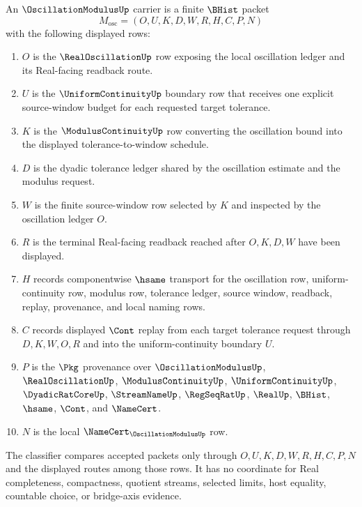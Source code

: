 \begin{definition}
\label{def:oscillation-modulus-carrier}
An $\OscillationModulusUp$ carrier is a finite $\BHist$ packet
$$
M_{\mathrm{osc}}=(O,U,K,D,W,R,H,C,P,N)
$$
with the following displayed rows:
\begin{enumerate}
\item $O$ is the $\RealOscillationUp$ row exposing the local oscillation ledger and its Real-facing readback route.
\item $U$ is the $\UniformContinuityUp$ boundary row that receives one explicit source-window budget for each requested target tolerance.
\item $K$ is the $\ModulusContinuityUp$ row converting the oscillation bound into the displayed tolerance-to-window schedule.
\item $D$ is the dyadic tolerance ledger shared by the oscillation estimate and the modulus request.
\item $W$ is the finite source-window row selected by $K$ and inspected by the oscillation ledger $O$.
\item $R$ is the terminal Real-facing readback reached after $O,K,D,W$ have been displayed.
\item $H$ records componentwise $\hsame$ transport for the oscillation row, uniform-continuity row, modulus row, tolerance ledger, source window, readback, replay, provenance, and local naming rows.
\item $C$ records displayed $\Cont$ replay from each target tolerance request through $D,K,W,O,R$ and into the uniform-continuity boundary $U$.
\item $P$ is the $\Pkg$ provenance over $\OscillationModulusUp$, $\RealOscillationUp$, $\ModulusContinuityUp$, $\UniformContinuityUp$, $\DyadicRatCoreUp$, $\StreamNameUp$, $\RegSeqRatUp$, $\RealUp$, $\BHist$, $\hsame$, $\Cont$, and $\NameCert$.
\item $N$ is the local $\NameCert_{\OscillationModulusUp}$ row.
\end{enumerate}
The classifier compares accepted packets only through $O,U,K,D,W,R,H,C,P,N$ and the displayed routes among those rows. It has no coordinate for Real completeness, compactness, quotient streams, selected limits, host equality, countable choice, or bridge-axis evidence.
\end{definition}


